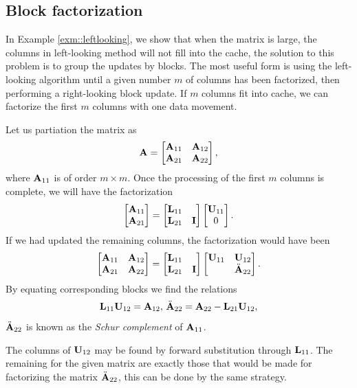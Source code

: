 \subsection{Block factorization}
\begin{alg}
    \label{exm::blockfactorize}
    In Example \ref{exm::leftlooking}, we show that when the 
    matrix is large, the columns in left-looking method will not 
    fill into the cache, the solution to this problem is to group 
    the updates by blocks. The most useful form is using the 
    left-looking algorithm until a given number $m$ of columns 
    has been factorized, then performing a right-looking block 
    update. If $m$ columns fit into cache, we can factorize the 
    first $m$ columns with one data movement.

    Let us partiation the matrix as
    $$
        {\mathbf{A}}=
        \begin{bmatrix}
            {\mathbf{A}}_{11}&{\mathbf{A}}_{12}\\{\mathbf{A}}_{21}&{\mathbf{A}}_{22}
        \end{bmatrix},
    $$ 
    where ${\mathbf{A}}_{11}$ is of order $m\times m$. Once the 
    processing of the first $m$ columns is complete, we will 
    have the factorization
    $$
        \begin{bmatrix}
            {\mathbf{A}}_{11}\\{\mathbf{A}}_{21}
        \end{bmatrix}=
        \begin{bmatrix}
            {\mathbf{L}}_{11}\\{\mathbf{L}}_{21}&{\mathbf{I}}
        \end{bmatrix}
        \begin{bmatrix}
            {\mathbf{U}}_{11}\\0
        \end{bmatrix}.
    $$ 
    If we had updated the remaining columns, the factorization 
    would have been
    $$
        \begin{bmatrix}
            {\mathbf{A}}_{11}&{\mathbf{A}}_{12}\\{\mathbf{A}}_{21}&{\mathbf{A}}_{22}
        \end{bmatrix}=
        \begin{bmatrix}
            {\mathbf{L}}_{11}\\{\mathbf{L}}_{21}&{\mathbf{I}}
        \end{bmatrix}
        \begin{bmatrix}
            {\mathbf{U}}_{11}&{\mathbf{U}}_{12}\\&\ddot{{\mathbf{A}}}_{22}
        \end{bmatrix}.
    $$ 
    By equating corresponding blocks we find the relations
    $$
        {\mathbf{L}}_{11}{\mathbf{U}}_{12}={\mathbf{A}}_{12},\,\ddot{{\mathbf{A}}}_{22}={\mathbf{A}}_{22}-{\mathbf{L}}_{21}{\mathbf{U}}_{12},
    $$
    $\ddot{{\mathbf{A}}}_{22}$ is known as the \textit{Schur complement} 
    of ${\mathbf{A}}_{11}$. 

    The columns of ${\mathbf{U}}_{12}$ may be found by forward 
    substitution through ${\mathbf{L}}_{11}$. The remaining for the 
    given matrix are exactly those that would be made for 
    factorizing the matrix $\ddot{{\mathbf{A}}}_{22}$, this can be done 
    by the same strategy.
\end{alg}

